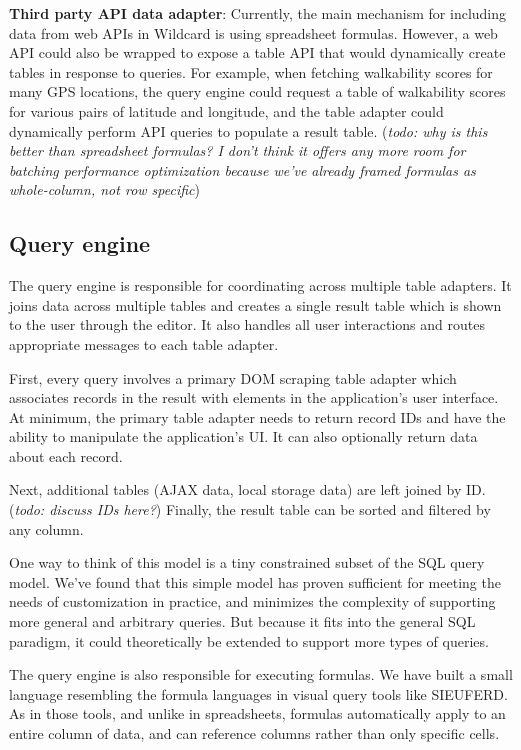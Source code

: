 \documentclass[sigplan,10pt,anonymous,review]{acmart}
\begin{document}
\textbf{Third party API data adapter}: Currently, the main mechanism for
including data from web APIs in Wildcard is using spreadsheet formulas.
However, a web API could also be wrapped to expose a table API that
would dynamically create tables in response to queries. For example,
when fetching walkability scores for many GPS locations, the query
engine could request a table of walkability scores for various pairs of
latitude and longitude, and the table adapter could dynamically perform
API queries to populate a result table. (\emph{todo: why is this better
than spreadsheet formulas? I don't think it offers any more room for
batching performance optimization because we've already framed formulas
as whole-column, not row specific})

\hypertarget{query-engine}{%
\subsection{Query engine}\label{query-engine}}

The query engine is responsible for coordinating across multiple table
adapters. It joins data across multiple tables and creates a single
result table which is shown to the user through the editor. It also
handles all user interactions and routes appropriate messages to each
table adapter.

First, every query involves a primary DOM scraping table adapter which
associates records in the result with elements in the application's user
interface. At minimum, the primary table adapter needs to return record
IDs and have the ability to manipulate the application's UI. It can also
optionally return data about each record.

Next, additional tables (AJAX data, local storage data) are left joined
by ID. (\emph{todo: discuss IDs here?}) Finally, the result table can be
sorted and filtered by any column.

One way to think of this model is a tiny constrained subset of the SQL
query model. We've found that this simple model has proven sufficient
for meeting the needs of customization in practice, and minimizes the
complexity of supporting more general and arbitrary queries. But because
it fits into the general SQL paradigm, it could theoretically be
extended to support more types of queries.

The query engine is also responsible for executing formulas. We have
built a small language resembling the formula languages in visual query
tools like SIEUFERD. As in those tools, and unlike in spreadsheets,
formulas automatically apply to an entire column of data, and can
reference columns rather than only specific cells.
\end{document}
